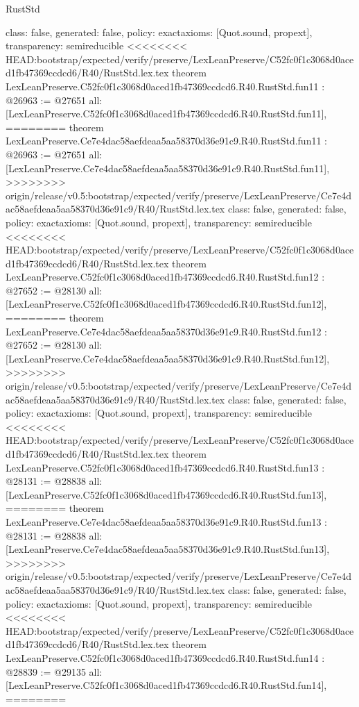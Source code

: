 \begin{lexlean}{RustStd}
\begin{coremodule}
{\begin{coremodule}
{{{{{{{{{{{{{{  class: false,
  generated: false,
  policy: exact{axioms: [Quot.sound, propext]},
  transparency: semireducible
}
<<<<<<<< HEAD:bootstrap/expected/verify/preserve/LexLeanPreserve/C52fc0f1c3068d0aced1fb47369ccdcd6/R40/RustStd.lex.tex
theorem LexLeanPreserve.C52fc0f1c3068d0aced1fb47369ccdcd6.R40.RustStd.fun11 : @26963 := @27651 {
  all: [LexLeanPreserve.C52fc0f1c3068d0aced1fb47369ccdcd6.R40.RustStd.fun11],
========
theorem LexLeanPreserve.Ce7e4dac58aefdeaa5aa58370d36e91c9.R40.RustStd.fun11 : @26963 := @27651 {
  all: [LexLeanPreserve.Ce7e4dac58aefdeaa5aa58370d36e91c9.R40.RustStd.fun11],
>>>>>>>> origin/release/v0.5:bootstrap/expected/verify/preserve/LexLeanPreserve/Ce7e4dac58aefdeaa5aa58370d36e91c9/R40/RustStd.lex.tex
  class: false,
  generated: false,
  policy: exact{axioms: [Quot.sound, propext]},
  transparency: semireducible
}
<<<<<<<< HEAD:bootstrap/expected/verify/preserve/LexLeanPreserve/C52fc0f1c3068d0aced1fb47369ccdcd6/R40/RustStd.lex.tex
theorem LexLeanPreserve.C52fc0f1c3068d0aced1fb47369ccdcd6.R40.RustStd.fun12 : @27652 := @28130 {
  all: [LexLeanPreserve.C52fc0f1c3068d0aced1fb47369ccdcd6.R40.RustStd.fun12],
========
theorem LexLeanPreserve.Ce7e4dac58aefdeaa5aa58370d36e91c9.R40.RustStd.fun12 : @27652 := @28130 {
  all: [LexLeanPreserve.Ce7e4dac58aefdeaa5aa58370d36e91c9.R40.RustStd.fun12],
>>>>>>>> origin/release/v0.5:bootstrap/expected/verify/preserve/LexLeanPreserve/Ce7e4dac58aefdeaa5aa58370d36e91c9/R40/RustStd.lex.tex
  class: false,
  generated: false,
  policy: exact{axioms: [Quot.sound, propext]},
  transparency: semireducible
}
<<<<<<<< HEAD:bootstrap/expected/verify/preserve/LexLeanPreserve/C52fc0f1c3068d0aced1fb47369ccdcd6/R40/RustStd.lex.tex
theorem LexLeanPreserve.C52fc0f1c3068d0aced1fb47369ccdcd6.R40.RustStd.fun13 : @28131 := @28838 {
  all: [LexLeanPreserve.C52fc0f1c3068d0aced1fb47369ccdcd6.R40.RustStd.fun13],
========
theorem LexLeanPreserve.Ce7e4dac58aefdeaa5aa58370d36e91c9.R40.RustStd.fun13 : @28131 := @28838 {
  all: [LexLeanPreserve.Ce7e4dac58aefdeaa5aa58370d36e91c9.R40.RustStd.fun13],
>>>>>>>> origin/release/v0.5:bootstrap/expected/verify/preserve/LexLeanPreserve/Ce7e4dac58aefdeaa5aa58370d36e91c9/R40/RustStd.lex.tex
  class: false,
  generated: false,
  policy: exact{axioms: [Quot.sound, propext]},
  transparency: semireducible
}
<<<<<<<< HEAD:bootstrap/expected/verify/preserve/LexLeanPreserve/C52fc0f1c3068d0aced1fb47369ccdcd6/R40/RustStd.lex.tex
theorem LexLeanPreserve.C52fc0f1c3068d0aced1fb47369ccdcd6.R40.RustStd.fun14 : @28839 := @29135 {
  all: [LexLeanPreserve.C52fc0f1c3068d0aced1fb47369ccdcd6.R40.RustStd.fun14],
========
}}}}}}}}}}}}}}}}}
\end{coremodule}}
\end{coremodule}
\end{lexlean}
